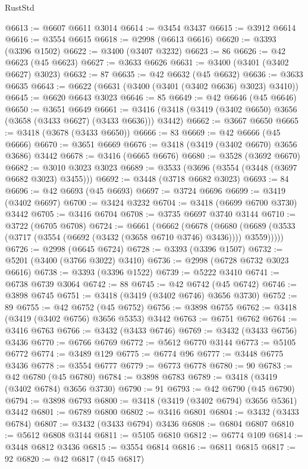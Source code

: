 \begin{lexlean}{RustStd}
\begin{coremodule}
@6613 := @6607 @6611 @3014
@6614 := @3454 @3437
@6615 := @3912 @6614
@6616 := @3554 @6615
@6618 := @2998 (@6613 @6616)
@6620 := @3393 (@3396 @1502)
@6622 := @3400 (@3407 @3232)
@6623 := 86
@6626 := @42 @6623 (@45 @6623)
@6627 := @3633 @6626
@6631 := @3400 (@3401 (@3402 @6627) @3023)
@6632 := 87
@6635 := @42 @6632 (@45 @6632)
@6636 := @3633 @6635
@6643 := @6622 (@6631 (@3400 (@3401 (@3402 @6636) @3023) @3410))
@6645 := @6620 @6643 @3023
@6646 := 85
@6649 := @42 @6646 (@45 @6646)
@6650 := @3651 @6649
@6661 := @3416 (@3418 (@3419 (@3402 @6650) @3656 (@3658 (@3433 @6627) (@3433 @6636))) @3442)
@6662 := @3667 @6650
@6665 := @3418 (@3678 (@3433 @6650))
@6666 := 83
@6669 := @42 @6666 (@45 @6666)
@6670 := @3651 @6669
@6676 := @3418 (@3419 (@3402 @6670) @3656 @3686) @3442
@6678 := @3416 (@6665 @6676)
@6680 := @3528 (@3692 @6670)
@6682 := @3010 @3023 @3023
@6689 := @3533 (@3696 (@3554 (@3448 (@3697 @6682 @3023) @3455)))
@6692 := @3448 (@3718 @6682 @3023)
@6693 := 84
@6696 := @42 @6693 (@45 @6693)
@6697 := @3724 @6696
@6699 := @3419 (@3402 @6697)
@6700 := @3424 @3232
@6704 := @3418 (@6699 @6700 @3730) @3442
@6705 := @3416 @6704
@6708 := @3735 @6697 @3740 @3144
@6710 := @3722 (@6705 @6708)
@6724 := @6661
    (@6662
      (@6678
        (@6680 (@6689 (@3533 (@3717 (@3554 (@6692 (@3432 (@3658 @6710 @3746) @3436)))) @3559)))))
@6726 := @2998 (@6645 @6724)
@6728 := @3393 (@3396 @1507)
@6732 := @5201 (@3400 (@3766 @3022) @3410)
@6736 := @2998 (@6728 @6732 @3023 @6616)
@6738 := @3393 (@3396 @1522)
@6739 := @5222 @3410
@6741 := @6738 @6739 @3064
@6742 := 88
@6745 := @42 @6742 (@45 @6742)
@6746 := @3898 @6745
@6751 := @3418 (@3419 (@3402 @6746) @3656 @3730)
@6752 := 89
@6755 := @42 @6752 (@45 @6752)
@6756 := @3898 @6755
@6762 := @3418 (@3419 (@3402 @6756) @3656 @5353) @3442
@6763 := @6751 @6762
@6764 := @3416 @6763
@6766 := @3432 (@3433 @6746)
@6769 := @3432 (@3433 @6756) @3436
@6770 := @6766 @6769
@6772 := @5612 @6770 @3144
@6773 := @5105 @6772
@6774 := @3489 @129
@6775 := @6774 @96
@6777 := @3448 @6775 @3436
@6778 := @3554 @6777
@6779 := @6773 @6778
@6780 := 90
@6783 := @42 @6780 (@45 @6780)
@6784 := @3898 @6783
@6789 := @3418 (@3419 (@3402 @6784) @3656 @3730)
@6790 := 91
@6793 := @42 @6790 (@45 @6790)
@6794 := @3898 @6793
@6800 := @3418 (@3419 (@3402 @6794) @3656 @5361) @3442
@6801 := @6789 @6800
@6802 := @3416 @6801
@6804 := @3432 (@3433 @6784)
@6807 := @3432 (@3433 @6794) @3436
@6808 := @6804 @6807
@6810 := @5612 @6808 @3144
@6811 := @5105 @6810
@6812 := @6774 @109
@6814 := @3448 @6812 @3436
@6815 := @3554 @6814
@6816 := @6811 @6815
@6817 := 92
@6820 := @42 @6817 (@45 @6817)

\end{coremodule}
\end{lexlean}
